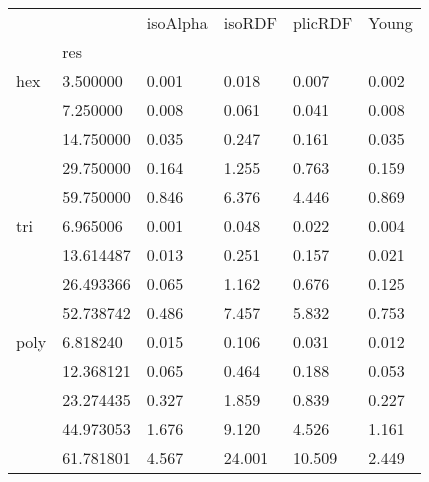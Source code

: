 \begin{tabular}{llllll}
\toprule
    &           & isoAlpha &  isoRDF & plicRDF &  Young \\
{} & res &          &         &         &        \\
\midrule
hex & 3.500000  &    0.001 &   0.018 &   0.007 &  0.002 \\
    & 7.250000  &    0.008 &   0.061 &   0.041 &  0.008 \\
    & 14.750000 &    0.035 &   0.247 &   0.161 &  0.035 \\
    & 29.750000 &    0.164 &   1.255 &   0.763 &  0.159 \\
    & 59.750000 &    0.846 &   6.376 &   4.446 &  0.869 \\
tri & 6.965006  &    0.001 &   0.048 &   0.022 &  0.004 \\
    & 13.614487 &    0.013 &   0.251 &   0.157 &  0.021 \\
    & 26.493366 &    0.065 &   1.162 &   0.676 &  0.125 \\
    & 52.738742 &    0.486 &   7.457 &   5.832 &  0.753 \\
poly & 6.818240  &    0.015 &   0.106 &   0.031 &  0.012 \\
    & 12.368121 &    0.065 &   0.464 &   0.188 &  0.053 \\
    & 23.274435 &    0.327 &   1.859 &   0.839 &  0.227 \\
    & 44.973053 &    1.676 &   9.120 &   4.526 &  1.161 \\
    & 61.781801 &    4.567 &  24.001 &  10.509 &  2.449 \\
\bottomrule
\end{tabular}
